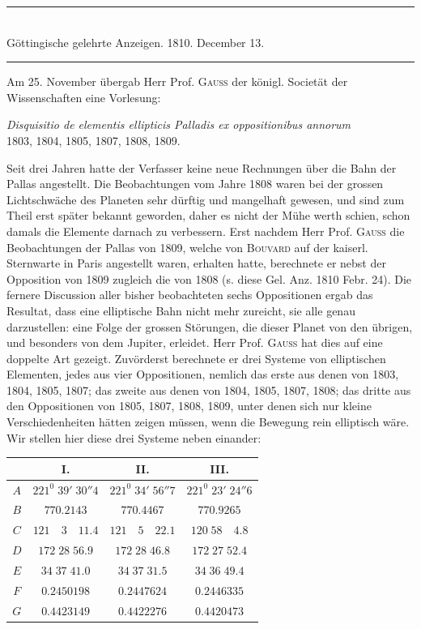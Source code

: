 \clearpage
{}
\begin{center}\rule{.75\textwidth}{.3pt}\\
Göttingische gelehrte Anzeigen. 1810. December 13.\\
\rule{.75\textwidth}{.3pt}\end{center}
Am 25. November übergab Herr Prof. \textsc{Gauss} der königl. Societät der Wissenschaften
eine Vorlesung:
\begin{center}
\textit{Disquisitio de elementis ellipticis Palladis ex oppositionibus annorum}\\
1803, 1804, 1805, 1807, 1808, 1809.
\end{center}
Seit drei Jahren hatte der Verfasser keine neue Rechnungen über die Bahn
der Pallas angestellt. Die Beobachtungen vom Jahre 1808 waren bei der grossen
Lichtschwäche des Planeten sehr dürftig und mangelhaft gewesen, und sind zum
Theil erst später bekannt geworden, daher es nicht der Mühe werth schien, schon
damals die Elemente darnach zu verbessern. Erst nachdem Herr Prof. \textsc{Gauss} die
Beobachtungen der Pallas von 1809, welche von \textsc{Bouvard} auf der kaiserl. Sternwarte
in Paris angestellt waren, erhalten hatte, berechnete er nebst der Opposition
von 1809 zugleich die von 1808 (s. diese Gel. Anz. 1810 Febr. 24). Die fernere
Discussion aller bisher beobachteten sechs Oppositionen ergab das Resultat,
dass eine elliptische Bahn nicht mehr zureicht, sie alle genau darzustellen: eine
Folge der grossen Störungen, die dieser Planet von den übrigen, und besonders
von dem Jupiter, erleidet. Herr Prof. \textsc{Gauss} hat dies auf eine doppelte Art gezeigt.
Zuvörderst berechnete er drei Systeme von elliptischen Elementen, jedes
aus vier Oppositionen, nemlich das erste aus denen von 1803, 1804, 1805, 1807;
%
das zweite aus denen von 1804, 1805, 1807, 1808; das dritte aus den Oppositionen
von 1805, 1807, 1808, 1809, unter denen sich nur kleine Verschiedenheiten
hätten zeigen müssen, wenn die Bewegung rein elliptisch wäre. Wir stellen
hier diese drei Systeme neben einander:
\begin{center}
\setlength{\tabcolsep}{5pt}
\begin{tabular}{c|c|c|c}
& I. & II. & III.\\\hline
$A$ & $221^0\;39'\;30''4$ & $221^0\;34'\;56''7$ & $221^0\;23'\;24''6$\\
$B$ & $770.2143$ & $770.4467$ & $770.9265$\\
$C$ & $121\quad3\quad11.4$ & $121\quad5\quad22.1$ & $120\;58\quad4.8$\\
$D$ & $172\;28\;56.9$ & $172\;28\;46.8$ & $172\;27\;52.4$\\
$E$ & $34\;37\;41.0$ & $34\;37\;31.5$ & $34\;36\;49.4$\\
$F$ & $0.2450198$ & $0.2447624$ & $0.2446335$\\
$G$ & $0.4423149$ & $0.4422276$ & $0.4420473$
\end{tabular}
\end{center}
